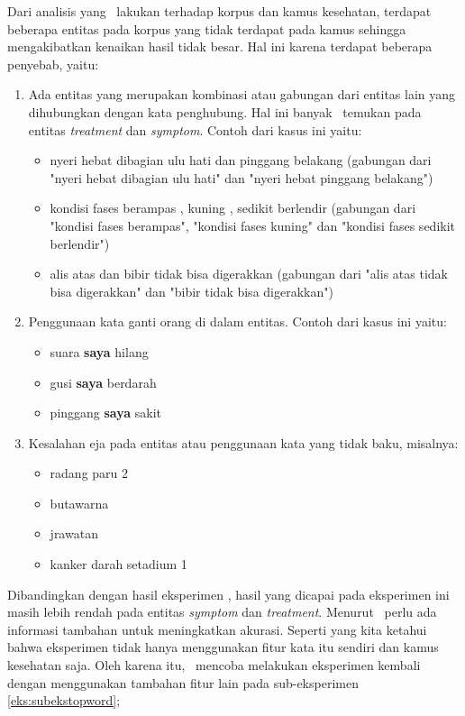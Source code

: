 	Dari analisis yang \saya~lakukan terhadap korpus dan kamus kesehatan, terdapat beberapa entitas pada korpus yang tidak terdapat pada kamus sehingga mengakibatkan kenaikan hasil tidak besar. Hal ini karena terdapat beberapa penyebab, yaitu:
	\begin{enumerate}
		\item Ada entitas yang merupakan kombinasi atau gabungan dari entitas lain yang dihubungkan dengan kata penghubung. Hal ini banyak \saya~temukan pada entitas \textit{treatment} dan \textit{symptom}. Contoh dari kasus ini yaitu:
		\begin{itemize}
			\item nyeri hebat dibagian ulu hati dan pinggang belakang (gabungan dari "nyeri hebat dibagian ulu hati" dan "nyeri hebat pinggang belakang")
			\item kondisi fases berampas , kuning , sedikit berlendir (gabungan dari "kondisi fases berampas", "kondisi fases kuning" dan "kondisi fases sedikit berlendir")
			\item alis atas dan bibir tidak bisa digerakkan (gabungan dari "alis atas tidak bisa digerakkan" dan "bibir tidak bisa digerakkan")
		\end{itemize}
		
		\item Penggunaan kata ganti orang di dalam entitas. Contoh dari kasus ini yaitu:
		\begin{itemize}
			\item suara \textbf{saya} hilang
			\item gusi \textbf{saya} berdarah
			\item pinggang \textbf{saya} sakit
		\end{itemize}
		
		\item Kesalahan eja pada entitas atau penggunaan kata yang tidak baku, misalnya:
		\begin{itemize}
			\item radang paru 2
			\item butawarna
			\item jrawatan
			\item kanker darah setadium 1
		\end{itemize}
	\end{enumerate}

	Dibandingkan dengan hasil eksperimen \cite{skripsiKakRadit}, hasil yang dicapai pada eksperimen ini masih lebih rendah pada entitas \textit{symptom} dan \textit{treatment}. Menurut \saya~perlu ada informasi tambahan untuk meningkatkan akurasi. Seperti yang kita ketahui bahwa eksperimen \cite{skripsiKakRadit} tidak hanya menggunakan fitur kata itu sendiri dan kamus kesehatan saja. Oleh karena itu, \saya~mencoba melakukan eksperimen kembali dengan menggunakan tambahan fitur lain pada sub-eksperimen \ref{eks:subekstopword};
	
